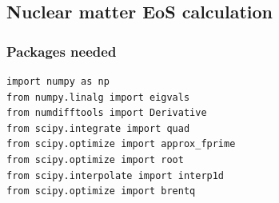 \documentclass[12pt]{article}
\begin{document}
\newpage
\subsection{Nuclear matter EoS calculation}

\subsubsection{Packages needed}
\begin{lstlisting}[style=mypython]
import numpy as np
from numpy.linalg import eigvals
from numdifftools import Derivative
from scipy.integrate import quad
from scipy.optimize import approx_fprime
from scipy.optimize import root
from scipy.interpolate import interp1d
from scipy.optimize import brentq
\end{lstlisting}
\end{document}
